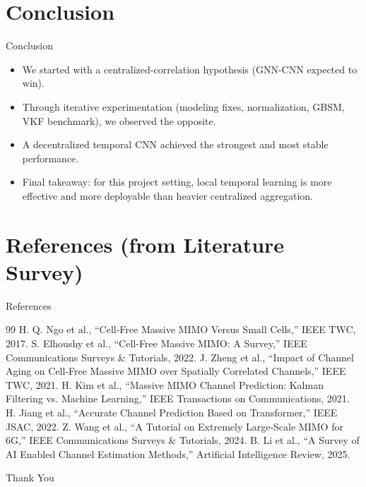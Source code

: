 \documentclass{beamer}
\begin{document}
\section{Conclusion}

\begin{frame}{Conclusion}
    \small
    \begin{itemize}
        \item We started with a centralized-correlation hypothesis (GNN-CNN expected to win).
        \item Through iterative experimentation (modeling fixes, normalization, GBSM, VKF benchmark), we observed the opposite.
        \item A decentralized temporal CNN achieved the strongest and most stable performance.
        \item Final takeaway: for this project setting, local temporal learning is more effective and more deployable than heavier centralized aggregation.
    \end{itemize}
\end{frame}

\section[References]{References (from Literature Survey)}

\begin{frame}[allowframebreaks]{References}
    \scriptsize
    \begin{thebibliography}{99}
         H. Q. Ngo et al., ``Cell-Free Massive MIMO Versus Small Cells,'' IEEE TWC, 2017.
         S. Elhoushy et al., ``Cell-Free Massive MIMO: A Survey,'' IEEE Communications Surveys \& Tutorials, 2022.
         J. Zheng et al., ``Impact of Channel Aging on Cell-Free Massive MIMO over Spatially Correlated Channels,'' IEEE TWC, 2021.
         H. Kim et al., ``Massive MIMO Channel Prediction: Kalman Filtering vs. Machine Learning,'' IEEE Transactions on Communications, 2021.
         H. Jiang et al., ``Accurate Channel Prediction Based on Transformer,'' IEEE JSAC, 2022.
         Z. Wang et al., ``A Tutorial on Extremely Large-Scale MIMO for 6G,'' IEEE Communications Surveys \& Tutorials, 2024.
         B. Li et al., ``A Survey of AI Enabled Channel Estimation Methods,'' Artificial Intelligence Review, 2025.
    \end{thebibliography}
\end{frame}

\begin{frame}
    \begin{center}
        {\Huge\calligra Thank You}
    \end{center}
\end{frame}
\end{document}
